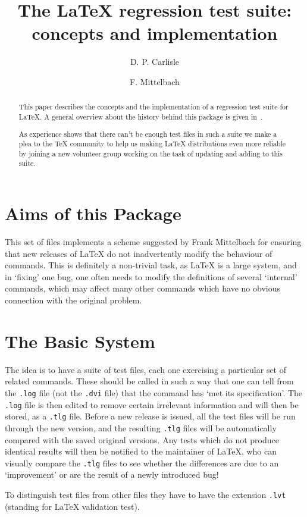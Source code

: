\documentclass[final]{ltugboat}
\title{The \LaTeX{} regression test suite: concepts and
implementation}
\author{D. P. Carlisle \and  F. Mittelbach}
\begin{document}
\maketitle

\begin{abstract}
  This paper describes the concepts and the implementation of a
  regression test suite for \LaTeX{}. A general overview about the
  history behind this package is given in~\cite{tub:xxx}.

  As experience shows that there can't be enough test files in such a
  suite we make a plea to the \TeX{} community to help us making
  \LaTeX{} distributions even more reliable by joining a new volunteer
  group working on the task of updating and adding to this suite.
\end{abstract}

\section{Aims of this Package}
This set of files implements a scheme suggested by Frank Mittelbach
for ensuring that new releases of \LaTeX{} do not inadvertently modify
the behaviour of commands. This is definitely a non-trivial task, as
\LaTeX{} is a large system, and in `fixing' one bug, one often needs
to modify the definitions of several `internal' commands, which may
affect many other commands which have no obvious connection with the
original problem.

\section{The Basic System}
The idea is to have a suite of test files, each one exercising a
particular set of related commands. These should be called in such a
way that one can tell from the \texttt{.log} file (not the \texttt{.dvi}
file) that the command has `met its specification'. The \texttt{.log}
file is then edited to remove certain irrelevant information and will
then be stored, as a \texttt{.tlg} file. Before a new release is issued,
all the test files will be run through the new version, and the
resulting \texttt{.tlg} files will be automatically compared with the
saved original versions. Any tests which do not produce identical
results will then be notified to the maintainer of
\LaTeX, who can visually compare the \texttt{.tlg} files to see whether the
differences are due to an `improvement' or are the result of a newly
introduced bug!

To distinguish test files from other files they have to have the
extension \texttt{.lvt} (standing for \LaTeX{} validation test).
\end{document}
